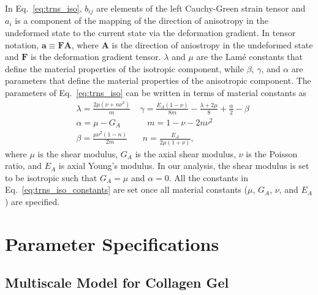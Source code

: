 \documentclass[]{interact}
\begin{document}
%
In Eq.\ \eqref{eq:trns_iso}, $b_{ij}$ are elements of the left Cauchy-Green strain tensor and $a_i$ is a component of the mapping of the direction of anisotropy in the undeformed state to the current state via the deformation gradient. In tensor notation, $\pmb{a} \equiv \pmb{F}\pmb{A}$, where $\pmb{A}$ is the direction of aniostropy in the undeformed state and $\pmb{F}$ is the deformation gradient tensor. $\lambda$ and $\mu$ are the Lam\'e constants that define the material properties of the isotropic component, while $\beta$, $\gamma$, and $\alpha$ are parameters that define the material properties of the anisotropic component. The parameters of Eq.\ \eqref{eq:trns_iso} can be written in terms of material constants as
%
\begin{align}
&\lambda = \frac{2\mu (\nu+n\nu^2)}{m} \ \ \ \ \ \gamma = \frac{E_A(1-\nu)}{8m} - \frac{\lambda+2\mu}{8} + \frac{\alpha}{2} - \beta \nonumber\\
%
&\alpha = \mu - G_A \ \ \ \ \ \ \ \ \ \ \ \ \ \ m = 1 - \nu - 2 n\nu^2 \nonumber\\
%
&\beta = \frac{\mu \nu^2(1-n)}{2m} \ \ \ \ \ \ \ \ n = \frac{E_A}{2\mu(1+\nu)},
\label{eq:trns_iso_constants}
\end{align}
%
where $\mu$ is the shear modulus, $G_A$ is the axial shear modulus, $\nu$ is the Poisson ratio, and $E_A$ is axial Young's modulus. In our analysis, the shear modulus is set to be isotropic such that $G_A=\mu$ and $\alpha = 0$. All the constants in Eq.\ \eqref{eq:trns_iso_constants} are set once all material constants ($\mu$, $G_A$, $\nu$, and $E_A$) are specified. 

\section{Parameter Specifications}

\subsection{Multiscale Model for Collagen Gel}
\end{document}
